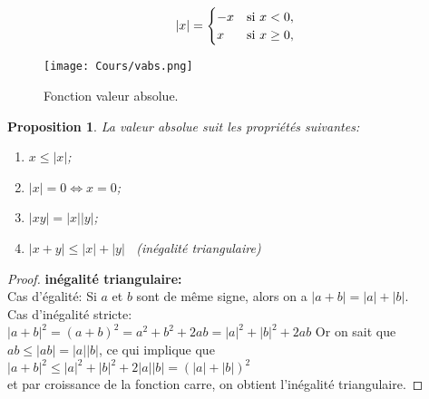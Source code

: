 \documentclass[a4paper, 12pt, french, twoside]{article}
\newtheorem{proposition}[theorem]{Proposition}
\begin{document}
\begin{equation}
|x|=
    \begin{cases}
        -x &{\rm si \,\, } x < 0 ,\\
        x &{\rm si \,\, } x \geq 0,
    \end{cases}
\end{equation}
\begin{figure}[H]
    \centering
    \texttt{[image: Cours/vabs.png]}
    \caption{Fonction valeur absolue.}
    \label{fig:enter-label}
\end{figure}


\begin{proposition}\label{prop3}
La valeur absolue suit les propriétés suivantes: 
    \begin{enumerate}
  \item $x\leq |x|$;
  \item $|x|=0 \iff x=0$;
  \item $|xy|=|x||y|$;
  \item $|x+y|\leq |x|+|y|$ \, (inégalité triangulaire)
\end{enumerate}
\end{proposition}
\begin{proof}
    \textbf{ inégalité triangulaire: }
\\Cas d'égalité:
Si $a$ et $b$ sont de même signe, alors on a $|a+b|=|a|+|b|$.
\\Cas d'inégalité stricte: 
\\$|a+b|^2 = (a+b)^2 = a^2+b^2+2ab = |a|^2+|b|^2+2ab $
Or on sait que $ab\leq|ab|=|a||b|$, ce qui implique que
\\$|a+b|^2\leq|a|^2+|b|^2+2|a||b|=(|a|+|b|)^2$
\\et par croissance de la fonction carre, on obtient l'inégalité triangulaire. 
\end{proof}
\end{document}
